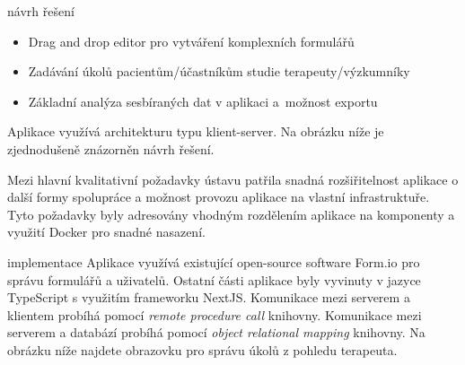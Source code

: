 \documentclass[portrait,a0paper,fontscale=0.25]{baposter}
\begin{document}
\begin{poster}
\begin{posterbox}[column=0, name=goals, below=intro]{návrh řešení}
            \begin{itemize}[leftmargin=*]
                \item Drag and drop editor pro vytváření komplexních formulářů
                \item Zadávání úkolů pacientům/účastníkům studie terapeuty/výzkumníky
                \item Základní analýza sesbíraných dat v aplikaci a~možnost exportu
            \end{itemize}

            Aplikace využívá architekturu typu klient-server.
            Na obrázku níže je zjednodušeně znázorněn návrh řešení.

            \begin{center}
                
            \end{center}

            Mezi hlavní kvalitativní požadavky ústavu patřila snadná rozšiřitelnost aplikace o další formy spolupráce a možnost provozu aplikace na vlastní infrastruktuře.
            Tyto požadavky byly adresovány vhodným rozdělením aplikace na komponenty a využití Docker pro snadné nasazení.
        \end{posterbox}

%
%


%
%
%

        \begin{posterbox}[column=1, name=impl]{implementace}
            Aplikace využívá existující open-source software Form.io pro správu formulářů a uživatelů.
            Ostatní části aplikace byly vyvinuty v jazyce TypeScript s využitím frameworku NextJS\@.
            Komunikace mezi serverem a klientem probíhá pomocí \textit{remote procedure call} knihovny.
            Komunikace mezi serverem a databází probíhá pomocí \textit{object relational mapping} knihovny.
            Na obrázku níže najdete obrazovku pro správu úkolů z pohledu terapeuta.


\end{posterbox}
\end{poster}
\end{document}
